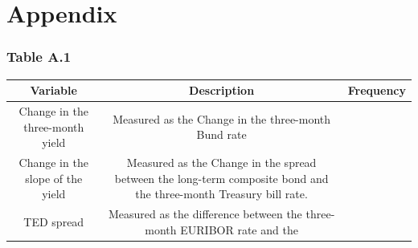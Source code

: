 \documentclass[
  10pt,
]{article}
\begin{document}
\hypertarget{appendix}{%
\section{Appendix}\label{appendix}}

\hypertarget{table-a.1}{%
\subsubsection{Table A.1}\label{table-a.1}}

\begin{longtable}[]{@{}ccc@{}}
\toprule
\begin{minipage}[b]{0.36\columnwidth}\centering
Variable\strut
\end{minipage} & \begin{minipage}[b]{0.32\columnwidth}\centering
Description\strut
\end{minipage} & \begin{minipage}[b]{0.24\columnwidth}\centering
Frequency\strut
\end{minipage}\tabularnewline
\midrule
\endhead
\begin{minipage}[t]{0.36\columnwidth}\centering
Change in the three-month yield\strut
\end{minipage} & \begin{minipage}[t]{0.32\columnwidth}\centering
Measured as the Change in the three-month Bund rate\strut
\end{minipage} & \begin{minipage}[t]{0.24\columnwidth}\centering
\strut
\end{minipage}\tabularnewline
\begin{minipage}[t]{0.36\columnwidth}\centering
Change in the slope of the yield\strut
\end{minipage} & \begin{minipage}[t]{0.32\columnwidth}\centering
Measured as the Change in the spread between the long-term composite
bond and the three-month Treasury bill rate.\strut
\end{minipage} & \begin{minipage}[t]{0.24\columnwidth}\centering
\strut
\end{minipage}\tabularnewline
\begin{minipage}[t]{0.36\columnwidth}\centering
TED spread\strut
\end{minipage} & \begin{minipage}[t]{0.32\columnwidth}\centering
Measured as the difference between the three-month EURIBOR rate and the

\end{minipage}
\end{longtable}
\end{document}
